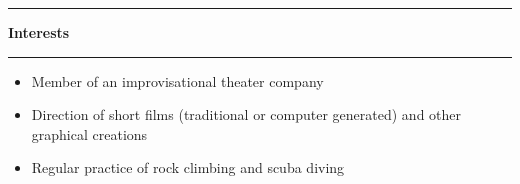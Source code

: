 \documentclass[a4paper,11pt]{article} %
\newcommand{\trad}[2]{#1}
\newcommand{\titre}[1]{%
	\begin{center}
	\rule{\textwidth}{1pt}
	\par
	\vspace{0.1cm}
        \textbf{\large #1}
	\par\rule{\textwidth}{1pt}
	\end{center}
	}
\newenvironment{customitemize}[0]
  { \begin{itemize}
    \addtolength{\itemsep}{\trad{-0.2}{0}\baselineskip}
    \addtolength{\baselineskip}{\trad{-0.2}{0}\baselineskip} }
  { \end{itemize} }
\begin{document}
\titre{\trad{Interests}{Centres d'Intérêts}}


	\begin{customitemize}
	\item \trad{Member of an improvisational theater company}                   								{Membre d'une troupe d'improvisation théatrale}
	\item \trad{Direction of short films (traditional or computer generated) and other graphical creations}   	{Réalisation de courts métrages et autres créations graphiques} %
	\item \trad{Regular practice of rock climbing and scuba diving}                         				{Pratique régulière de l'escalade et de la plongée sous-marine}
	\end{customitemize}

	

\end{document}
